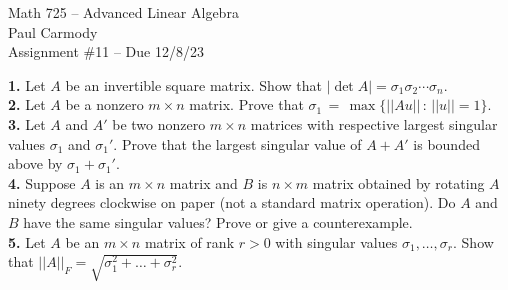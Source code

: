 \documentclass[11pt]{amsart}
\theoremstyle{definition}  %
\begin{document}
\begin{center}
\Large{Math 725 -- Advanced Linear Algebra}\\
\large{Paul Carmody}\\
Assignment \#11 -- Due 12/8/23
\end{center}
\vskip 1.0cm


\noindent
{\bf 1.} Let $A$ be an invertible square matrix.  Show that $|\det A| = \sigma_1 \sigma_2 \cdots \sigma_n$. \\



\vskip 0.1cm
\noindent
{\bf 2.}  Let $A$ be a nonzero $m \times n$ matrix. Prove that $\sigma_1 \, = \, \max \{|| Au || \, : \, || u || = 1\}$. \\ 


\vskip 0.1cm
\noindent
{\bf 3.}  Let $A$ and $A'$ be two nonzero $m \times n$ matrices with respective largest singular values $\sigma_1$ and 
$\sigma_1'$. Prove that the largest singular value of $A + A'$ is bounded above by $\sigma_1 + \sigma_1'$. \\
 

\vskip 0.1cm
\noindent
{\bf 4.} Suppose $A$ is an $m \times n$ matrix and $B$ is $n \times m$ matrix obtained by rotating $A$ ninety degrees clockwise on paper
(not a standard matrix operation). Do $A$ and $B$ have the same singular values? Prove or give a counterexample. \\


\vskip 0.1cm
\noindent
{\bf 5.} Let $A$ be an $m \times n$ matrix of rank $r > 0$ with singular values $\sigma_1, \ldots, \sigma_r$. 
Show that $|| A ||_F = \sqrt{\sigma_1^2 + \ldots + \sigma_r^2}$. \\
\end{document}
